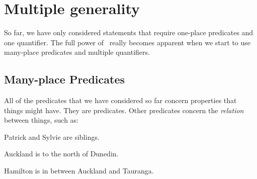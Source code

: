 \documentclass[PHIL101-Textbook.tex]{subfiles}
\begin{document}
\chapter{Multiple generality}\label{ch:MultipleGenerality}

So far, we have only considered statements that require one-place predicates and one quantifier. The full power of \pl\ really becomes apparent when we start to use many-place predicates and multiple quantifiers. %


\section{Many-place Predicates}

\begin{center}
  \href{https://youtu.be/agbTz5OrrtM}
  {}
\end{center}

All of the predicates that we have considered so far concern properties that things might have. %
They are  predicates.
Other predicates concern the \emph{relation} between things, such as: 
\begin{earg}
\item[\ex{rela}] Patrick and Sylvie are siblings.
\item[\ex{relb}] Auckland is to the north of Dunedin.
\item[\ex{relc}] Hamilton is in between Auckland and Tauranga.
\end{earg}
\end{document}
